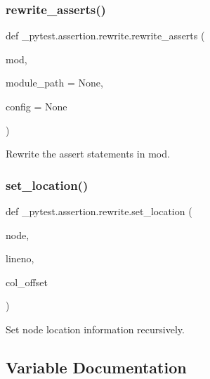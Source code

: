 \subsubsection{\texorpdfstring{rewrite\+\_\+asserts()}{rewrite\_asserts()}}
{\footnotesize\ttfamily def \+\_\+pytest.\+assertion.\+rewrite.\+rewrite\+\_\+asserts (\begin{DoxyParamCaption}\item[{}]{mod,  }\item[{}]{module\+\_\+path = {\ttfamily None},  }\item[{}]{config = {\ttfamily None} }\end{DoxyParamCaption})}

\begin{DoxyVerb}Rewrite the assert statements in mod.\end{DoxyVerb}
 \mbox{\label{namespace__pytest_1_1assertion_1_1rewrite_a1c8350026dcdb06c53ce94b0eb8f060e}} 
\subsubsection{\texorpdfstring{set\+\_\+location()}{set\_location()}}
{\footnotesize\ttfamily def \+\_\+pytest.\+assertion.\+rewrite.\+set\+\_\+location (\begin{DoxyParamCaption}\item[{}]{node,  }\item[{}]{lineno,  }\item[{}]{col\+\_\+offset }\end{DoxyParamCaption})}

\begin{DoxyVerb}Set node location information recursively.\end{DoxyVerb}
 

\subsection{Variable Documentation}
\mbox{\label{namespace__pytest_1_1assertion_1_1rewrite_a64db863cad4ff3771c83875d3e99b5a3}} 
